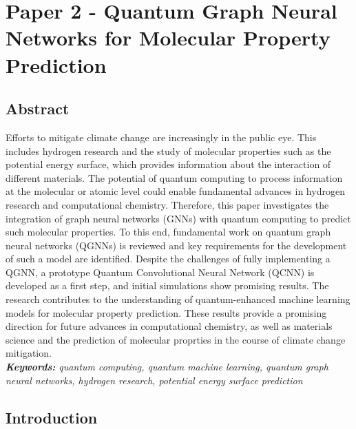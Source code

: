 \chapter{Paper 2 - Quantum Graph Neural Networks for Molecular Property Prediction}

\section*{Abstract}

Efforts to mitigate climate change are increasingly in the public eye. This includes hydrogen research and the study of molecular properties such as the potential energy surface, which provides information about the interaction of different materials. The potential of quantum computing to process information at the molecular or atomic level could enable fundamental advances in hydrogen research and computational chemistry. Therefore, this paper investigates the integration of graph neural networks (GNNs) with quantum computing to predict such molecular properties. To this end, fundamental work on quantum graph neural networks (QGNNs) is reviewed and key requirements for the development of such a model are identified. Despite the challenges of fully implementing a QGNN, a prototype Quantum Convolutional Neural Network (QCNN) is developed as a first step, and initial simulations show promising results. The research contributes to the understanding of quantum-enhanced machine learning models for molecular property prediction. These results provide a promising direction for future advances in computational chemistry, as well as materials science and the prediction of molecular proprties in the course of climate change mitigation. \\

\textit{\textbf{Keywords:} quantum computing, 
quantum machine learning, quantum graph neural networks, hydrogen research, potential energy surface prediction}

\section{Introduction}
\label{sec:introduction}

